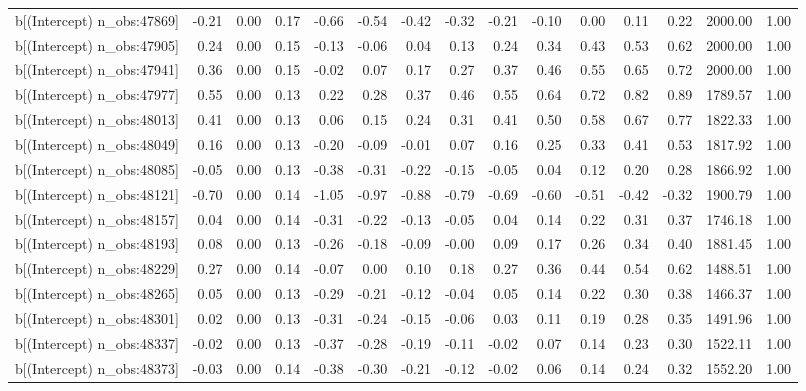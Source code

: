\begin{table}[ht]
\begin{tabular}{rrrrrrrrrrrrrrr}
  b[(Intercept) n\_obs:47869] & -0.21 & 0.00 & 0.17 & -0.66 & -0.54 & -0.42 & -0.32 & -0.21 & -0.10 & 0.00 & 0.11 & 0.22 & 2000.00 & 1.00 \\ 
  b[(Intercept) n\_obs:47905] & 0.24 & 0.00 & 0.15 & -0.13 & -0.06 & 0.04 & 0.13 & 0.24 & 0.34 & 0.43 & 0.53 & 0.62 & 2000.00 & 1.00 \\ 
  b[(Intercept) n\_obs:47941] & 0.36 & 0.00 & 0.15 & -0.02 & 0.07 & 0.17 & 0.27 & 0.37 & 0.46 & 0.55 & 0.65 & 0.72 & 2000.00 & 1.00 \\ 
  b[(Intercept) n\_obs:47977] & 0.55 & 0.00 & 0.13 & 0.22 & 0.28 & 0.37 & 0.46 & 0.55 & 0.64 & 0.72 & 0.82 & 0.89 & 1789.57 & 1.00 \\ 
  b[(Intercept) n\_obs:48013] & 0.41 & 0.00 & 0.13 & 0.06 & 0.15 & 0.24 & 0.31 & 0.41 & 0.50 & 0.58 & 0.67 & 0.77 & 1822.33 & 1.00 \\ 
  b[(Intercept) n\_obs:48049] & 0.16 & 0.00 & 0.13 & -0.20 & -0.09 & -0.01 & 0.07 & 0.16 & 0.25 & 0.33 & 0.41 & 0.53 & 1817.92 & 1.00 \\ 
  b[(Intercept) n\_obs:48085] & -0.05 & 0.00 & 0.13 & -0.38 & -0.31 & -0.22 & -0.15 & -0.05 & 0.04 & 0.12 & 0.20 & 0.28 & 1866.92 & 1.00 \\ 
  b[(Intercept) n\_obs:48121] & -0.70 & 0.00 & 0.14 & -1.05 & -0.97 & -0.88 & -0.79 & -0.69 & -0.60 & -0.51 & -0.42 & -0.32 & 1900.79 & 1.00 \\ 
  b[(Intercept) n\_obs:48157] & 0.04 & 0.00 & 0.14 & -0.31 & -0.22 & -0.13 & -0.05 & 0.04 & 0.14 & 0.22 & 0.31 & 0.37 & 1746.18 & 1.00 \\ 
  b[(Intercept) n\_obs:48193] & 0.08 & 0.00 & 0.13 & -0.26 & -0.18 & -0.09 & -0.00 & 0.09 & 0.17 & 0.26 & 0.34 & 0.40 & 1881.45 & 1.00 \\ 
  b[(Intercept) n\_obs:48229] & 0.27 & 0.00 & 0.14 & -0.07 & 0.00 & 0.10 & 0.18 & 0.27 & 0.36 & 0.44 & 0.54 & 0.62 & 1488.51 & 1.00 \\ 
  b[(Intercept) n\_obs:48265] & 0.05 & 0.00 & 0.13 & -0.29 & -0.21 & -0.12 & -0.04 & 0.05 & 0.14 & 0.22 & 0.30 & 0.38 & 1466.37 & 1.00 \\ 
  b[(Intercept) n\_obs:48301] & 0.02 & 0.00 & 0.13 & -0.31 & -0.24 & -0.15 & -0.06 & 0.03 & 0.11 & 0.19 & 0.28 & 0.35 & 1491.96 & 1.00 \\ 
  b[(Intercept) n\_obs:48337] & -0.02 & 0.00 & 0.13 & -0.37 & -0.28 & -0.19 & -0.11 & -0.02 & 0.07 & 0.14 & 0.23 & 0.30 & 1522.11 & 1.00 \\ 
  b[(Intercept) n\_obs:48373] & -0.03 & 0.00 & 0.14 & -0.38 & -0.30 & -0.21 & -0.12 & -0.02 & 0.06 & 0.14 & 0.24 & 0.32 & 1552.20 & 1.00 \\ 

\end{tabular}
\end{table}
